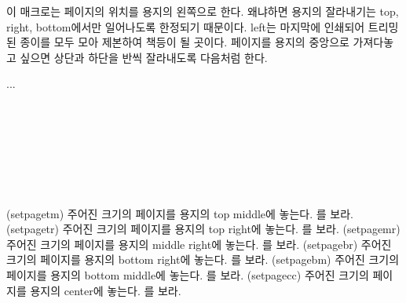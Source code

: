 이 매크로는 페이지의 위치를 용지의 왼쪽으로 한다. 왜냐하면 용지의 잘라내기는
top, right, bottom에서만 일어나도록 한정되기 때문이다.
left는 마지막에 인쇄되어 트리밍된
종이를 모두 모아 제본하여 책등이 될 곳이다.
페이지를 용지의 중앙으로 가져다놓고 싶으면 상단과 하단을 반씩 잘라내도록
다음처럼 한다.
\begin{lcode}
\settrims{0.5\trimtop}{0.5\trimedge}
...
\checkandfixthelayout
\end{lcode}

\begin{syntax}
\cmd{\setpagetm} \\
\cmd{\setpagetr} \\
\cmd{\setpagemr} \\
\cmd{\setpagebr} \\
\cmd{\setpagebm} \\
\cmd{\setpagecc} \\
\end{syntax}
\glossary(setpagetm)%
  {}%
  {주어진 크기의 페이지를 용지의 top middle에 놓는다. 를 보라.}
\glossary(setpagetr)%
  {}%
  {주어진 크기의 페이지를 용지의 top right에 놓는다. 를 보라.}
\glossary(setpagemr)%
  {}%
  {주어진 크기의 페이지를 용지의 middle right에 놓는다. 를 보라.}
\glossary(setpagebr)%
  {}%
  {주어진 크기의 페이지를 용지의 bottom right에 놓는다. 를 보라.}
\glossary(setpagebm)%
  {}%
  {주어진 크기의 페이지를 용지의 bottom middle에 놓는다. 를 보라.}
\glossary(setpagecc)%
  {}%
  {주어진 크기의 페이지를 용지의 center에 놓는다. 를 보라.}

